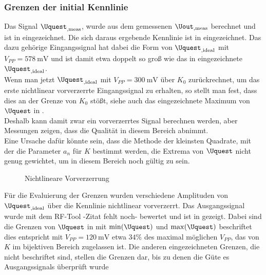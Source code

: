 \documentclass[../Report.tex]{subfiles}
\begin{document}
\subsubsection*{Grenzen der initial Kennlinie}
\label{subsubsec:opt.adjusta.problem}
Das Signal $\Uquest_{,\mathrm{meas}}$, wurde aus dem gemessenen $\Uout_{,\mathrm{meas}}$ berechnet und ist in  eingezeichnet. Die sich daraus ergebende Kennlinie ist in  eingezeichnet. Das dazu gehörige Eingangssignal hat dabei die Form von $\Uquest_{, \mathrm{ideal}}$ mit $V_{PP} = \SI{578}{\mV}$ und ist damit etwa doppelt so groß wie das in  eingezeichnete $\Uquest_{, \mathrm{ideal}}$.\\
Wenn man jetzt $\Uquest_{, \mathrm{ideal}}$ mit $V_{PP} = \SI{300}{\mV}$ über $K_0$ zurückrechnet, um das erste nichtlinear vorverzerrte Eingangssignal zu erhalten, so stellt man fest, dass dies an der Grenze von $K_0$ stößt, siehe auch das eingezeichnete Maximum von $\Uquest$ in . \\
Deshalb kann damit zwar ein vorverzerrtes Signal berechnen werden, aber Messungen zeigen, dass die Qualität in diesem Bereich abnimmt. \\
Eine Ursache dafür könnte sein, dass die Methode der kleinsten Quadrate, mit der die Parameter $a_n$ für $K$ bestimmt werden, die Extrema von $\Uquest$ nicht genug gewichtet, um in diesem Bereich noch gültig zu sein.
\begin{figure}[H]
\begin{subfigure}{0.5 \textwidth}
	\setlength\figureheight{8cm}
	\setlength\figurewidth{8cm}
    	
	\label{fig:K0}
\end{subfigure}
\begin{subfigure}{0.5 \textwidth}
	\setlength\figureheight{8cm}
	\setlength\figurewidth{8cm}
    
	\label{fig:UinUquest}
\end{subfigure}
\caption{Nichtlineare Vorverzerrung}
\label{fig:Amplitudenproblem}
\end{figure}

Für die Evaluierung der Grenzen wurden verschiedene Amplituden von $\Uquest_{,\textrm{ideal}}$ über die Kennlinie nichtlinear vorverzerrt. Das Ausgangssignal wurde mit dem RF-Tool -Zitat fehlt noch- bewertet und ist in  gezeigt. Dabei sind die Grenzen von $\Uquest$ in  mit $\min(\Uquest)$ und $\max(\Uquest)$ beschriftet dies entspricht mit $V_{PP} = \SI{120}{\mV}$ etwa $34\%$ des maximal möglichen $V_{PP}$, das von $K$ im bijektiven Bereich zugelassen ist. Die anderen eingezeichneten Grenzen, die nicht beschriftet sind, stellen die Grenzen dar, bis zu denen die Güte es Ausgangssignals überprüft wurde
\end{document}
